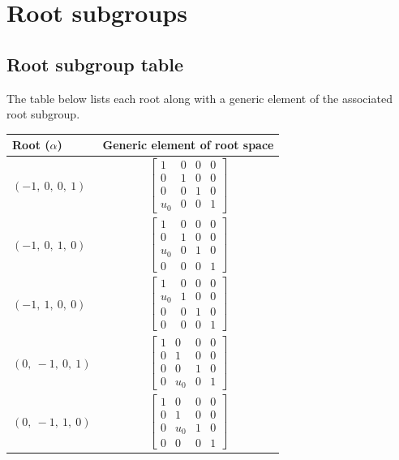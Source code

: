 \documentclass[11pt]{article}
\newcommand{\noi}{\noindent}
\theoremstyle{definition}
\begin{document}
\newpage
\section{Root subgroups}

\subsection{Root subgroup table}

\noi The table below lists each root along with a generic element of the associated root subgroup.

\bigskip

\noindent \begin{tabular}{|l|c|}
    \hline
    \textbf{Root ($\alpha$)} & \textbf{Generic element of root space} \\
    \hline
    $\left( -1, \  0, \  0, \  1\right)$ & $\left[\begin{matrix}1 & 0 & 0 & 0\\0 & 1 & 0 & 0\\0 & 0 & 1 & 0\\u_{0} & 0 & 0 & 1\end{matrix}\right]$ \\
    \hline
    $\left( -1, \  0, \  1, \  0\right)$ & $\left[\begin{matrix}1 & 0 & 0 & 0\\0 & 1 & 0 & 0\\u_{0} & 0 & 1 & 0\\0 & 0 & 0 & 1\end{matrix}\right]$ \\
    \hline
    $\left( -1, \  1, \  0, \  0\right)$ & $\left[\begin{matrix}1 & 0 & 0 & 0\\u_{0} & 1 & 0 & 0\\0 & 0 & 1 & 0\\0 & 0 & 0 & 1\end{matrix}\right]$ \\
    \hline
    $\left( 0, \  -1, \  0, \  1\right)$ & $\left[\begin{matrix}1 & 0 & 0 & 0\\0 & 1 & 0 & 0\\0 & 0 & 1 & 0\\0 & u_{0} & 0 & 1\end{matrix}\right]$ \\
    \hline
    $\left( 0, \  -1, \  1, \  0\right)$ & $\left[\begin{matrix}1 & 0 & 0 & 0\\0 & 1 & 0 & 0\\0 & u_{0} & 1 & 0\\0 & 0 & 0 & 1\end{matrix}\right]$ \\

\end{tabular}
\end{document}
